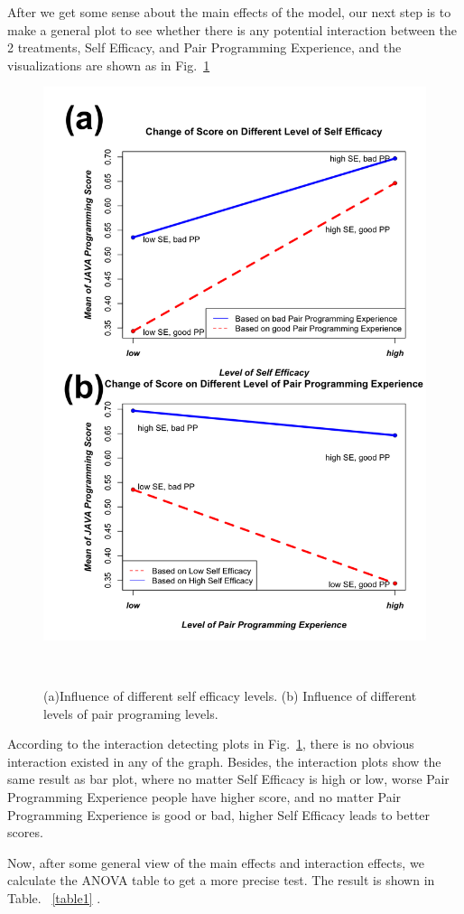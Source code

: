 \documentclass{sigchi}
\begin{document}
After we get some sense about the main effects of the model, our next step is to make a general plot to see whether there is any potential interaction between the 2 treatments, Self Efficacy, and Pair Programming Experience, and the visualizations are shown as in Fig.~\ref{fig:figure4}

\begin{figure}
\centering
  \includegraphics[width=0.8\columnwidth]{figures/fig4}
  \caption{(a)Influence of different self efficacy levels. (b) Influence of different levels of pair programing levels.}~\label{fig:figure4}
\end{figure}

According to the interaction detecting plots in Fig.~\ref{fig:figure4}, there is no obvious interaction existed in any of the graph. Besides, the interaction plots show the same result as bar plot, where no matter Self Efficacy is high or low, worse Pair Programming Experience people have higher score, and no matter Pair Programming Experience is good or bad, higher Self Efficacy leads to better scores.

Now, after some general view of the main effects and interaction effects, we calculate the ANOVA table to get a more precise test. The result is shown in Table. ~\ref{table1} .
\end{document}

